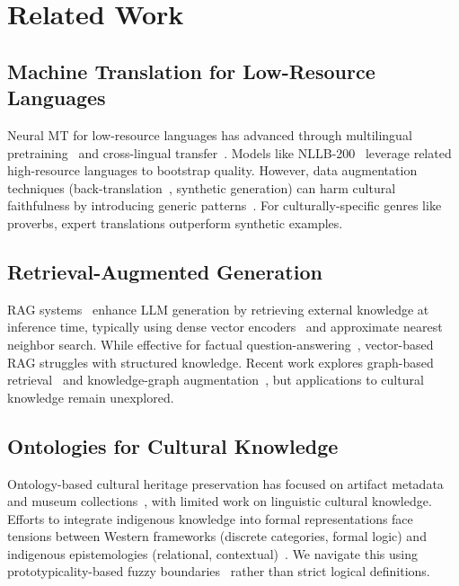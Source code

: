 
\section{Related Work}
\label{sec:related}

\subsection{Machine Translation for Low-Resource Languages}
\label{subsec:lrl_mt}

Neural MT for low-resource languages has advanced through multilingual pretraining~\cite{aharoni2019massively} and cross-lingual transfer~\cite{arivazhagan2019massively}. Models like NLLB-200~\cite{costa2022no} leverage related high-resource languages to bootstrap quality. However, data augmentation techniques (back-translation~\cite{sennrich2016improving}, synthetic generation) can harm cultural faithfulness by introducing generic patterns~\cite{lauscher2020zero}. For culturally-specific genres like proverbs, expert translations outperform synthetic examples.

\subsection{Retrieval-Augmented Generation}
\label{subsec:rag}

RAG systems~\cite{lewis2020retrieval} enhance LLM generation by retrieving external knowledge at inference time, typically using dense vector encoders~\cite{karpukhin2020dense} and approximate nearest neighbor search. While effective for factual question-answering~\cite{izacard2021leveraging}, vector-based RAG struggles with structured knowledge. Recent work explores graph-based retrieval~\cite{yasunaga2021qa} and knowledge-graph augmentation~\cite{sun2024head}, but applications to cultural knowledge remain unexplored.

\subsection{Ontologies for Cultural Knowledge}
\label{subsec:cultural_ontologies}

Ontology-based cultural heritage preservation has focused on artifact metadata~\cite{doerr2003cidoc} and museum collections~\cite{oldman2014realized}, with limited work on linguistic cultural knowledge. Efforts to integrate indigenous knowledge into formal representations face tensions between Western frameworks (discrete categories, formal logic) and indigenous epistemologies (relational, contextual)~\cite{schulte2021indigenous}. We navigate this using prototypicality-based fuzzy boundaries~\cite{rosch1973natural} rather than strict logical definitions.

